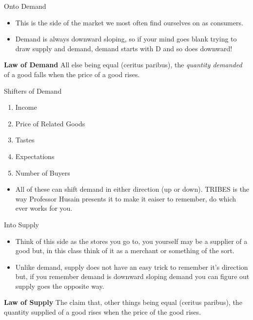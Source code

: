 \documentclass[aspectratio=169]{beamer}
\begin{document}
\begin{frame}{Onto Demand}
    \begin{itemize}
        \item This is the side of the market we most often find ourselves on as consumers.
        \vspace{5mm}
        \item Demand is always downward sloping, so if your mind goes blank trying to draw supply and demand, demand starts with D and so does downward!
    \end{itemize}
    \vspace{5mm}
    \begin{block}{\textbf{Law of Demand}}
        All else being equal (ceritus paribus), the \textit{quantity demanded} of a good falls when the price of a good rises.
    \end{block}
\end{frame}

\begin{frame}{Shifters of Demand}
    \begin{enumerate}
        \item<1-> Income
        \item<2-> Price of Related Goods
        \item<3-> Tastes
        \item<4-> Expectations
        \item<5-> Number of Buyers
    \end{enumerate}
    \vspace{5mm}
    \begin{itemize}
        \item<6-> All of these can shift demand in either direction (up or down). TRIBES is the way Professor Husain presents it to make it eaiser to remember, do which ever works for you.
    \end{itemize}
\end{frame}

\begin{frame}{Into Supply}
    \begin{itemize}
        \item Think of this side as the stores you go to, you yourself may be a supplier of a good but, in this class think of it as a merchant or something of the sort.
        \vspace{5mm}
        \item Unlike demand, supply does not have an easy trick to remember it's direction but, if you remember demand is downward sloping demand you can figure out supply goes the opposite way.
    \end{itemize}
    \vspace{5mm}
    \begin{block}{\textbf{Law of Supply}}
        The claim that, other things being equal (ceritus paribus), the quantity supplied of a good rises when the price of the good rises.
    \end{block}
\end{frame}
\end{document}
